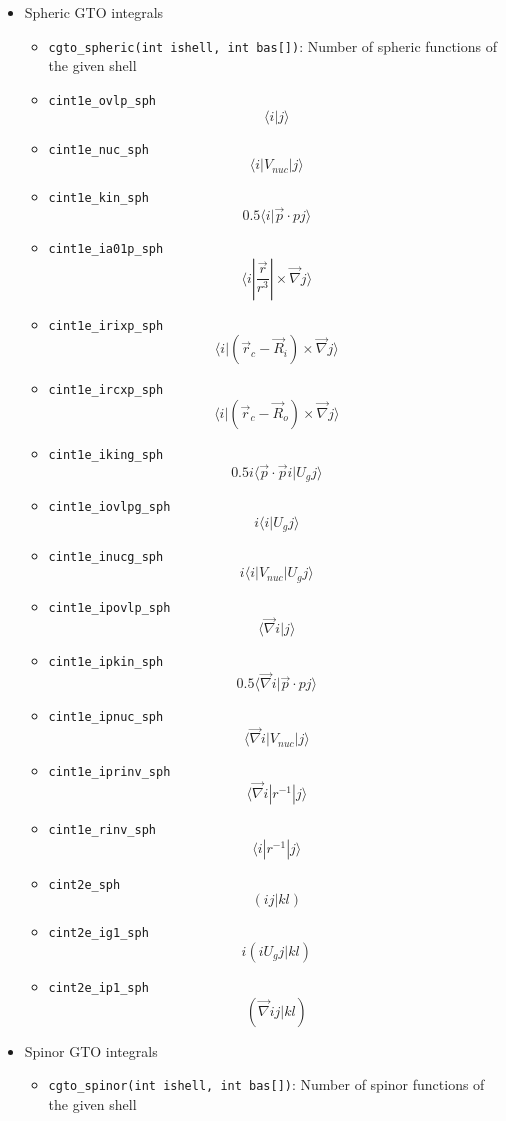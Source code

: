 \documentclass{article}
\begin{document}
\begin{itemize}
\item
  Spheric GTO integrals
  \begin{itemize}
  \item
    \verb!cgto_spheric(int ishell, int bas[])!: Number of spheric
    functions of the given shell
  \item
    \verb!cint1e_ovlp_sph! \[\langle  i| j\rangle \]
  \item
    \verb!cint1e_nuc_sph! \[\langle  i| V_{nuc}| j\rangle \]
  \item
    \verb!cint1e_kin_sph! \[0.5\langle i| \vec{p} \cdot pj\rangle \]
  \item
    \verb!cint1e_ia01p_sph!
    \[\langle i| \frac{\vec{r}}{r^3}| \times \vec{\nabla} j\rangle \]
  \item
    \verb!cint1e_irixp_sph!
    \[\langle i| (\vec{r}_c-\vec{R}_i) \times \vec{\nabla} j\rangle \]
  \item
    \verb!cint1e_ircxp_sph!
    \[\langle i| (\vec{r}_c-\vec{R}_o) \times \vec{\nabla} j\rangle \]
  \item
    \verb!cint1e_iking_sph!
    \[0.5i\langle \vec{p} \cdot \vec{p} i| U_gj\rangle \]
  \item
    \verb!cint1e_iovlpg_sph! \[i\langle i| U_gj\rangle \]
  \item
    \verb!cint1e_inucg_sph! \[i\langle i| V_{nuc}| U_gj\rangle \]
  \item
    \verb!cint1e_ipovlp_sph! \[\langle \vec{\nabla} i|j\rangle \]
  \item
    \verb!cint1e_ipkin_sph!
    \[0.5\langle \vec{\nabla} i| \vec{p} \cdot pj\rangle \]
  \item
    \verb!cint1e_ipnuc_sph!
    \[\langle \vec{\nabla} i| V_{nuc}|j\rangle \]
  \item
    \verb!cint1e_iprinv_sph!
    \[\langle \vec{\nabla} i| r^{-1}|j\rangle \]
  \item
    \verb!cint1e_rinv_sph! \[\langle i| r^{-1} |j\rangle \]
  \item
    \verb!cint2e_sph! \[(ij|kl)\]
  \item
    \verb!cint2e_ig1_sph! \[i(i U_g j|kl)\]
  \item
    \verb!cint2e_ip1_sph! \[(\vec{\nabla} i j|kl)\]
  \end{itemize}
\item
  Spinor GTO integrals
  \begin{itemize}
  \item
    \verb!cgto_spinor(int ishell, int bas[])!: Number of spinor
    functions of the given shell

\end{itemize}
\end{itemize}
\end{document}
